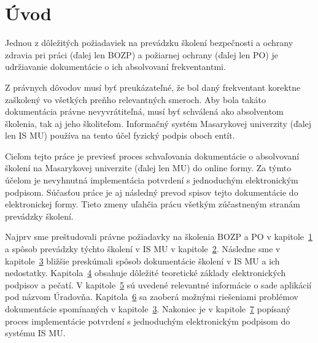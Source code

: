 \documentclass[
  digital,     %
  oneside,     %
  nosansbold,  %
  nocolorbold, %
  lof,         %
  nolot,         %
]{fithesis4}
\begin{document}
\chapter*{Úvod}
\label{chap:intro}
Jednou z dôležitých požiadaviek na prevádzku školení bezpečnosti a ochrany zdravia pri práci (ďalej len BOZP) a požiarnej ochrany (ďalej len PO) je udržiavanie dokumentácie o ich absolvovaní frekventantmi.

Z právnych dôvodov musí byť preukázateľné, že bol daný frekventant korektne zaškolený vo všetkých preňho relevantných smeroch. Aby bola takáto dokumentácia právne nevyvrátiteľná, musí byť schválená ako absolventom školenia, tak aj jeho školiteľom. Informačný systém Masarykovej univerzity (ďalej len IS MU) používa na tento účel fyzický podpis oboch entít.

Cieľom tejto práce je previesť proces schvaľovania dokumentácie o absolvovaní školení na Masarykovej univerzite (ďalej len MU) do online formy. Za týmto účelom je nevyhnutná implementácia potvrdení s jednoduchým elektronickým podpisom. Súčasťou práce je aj následný prevod spisov tejto dokumentácie do elektronickej formy. Tieto zmeny uľahčia prácu všetkým zúčastneným stranám prevádzky školení.

Najprv sme preštudovali právne požiadavky na školenia BOZP a PO v kapitole~\hyperref[kap-1]{1} a spôsob prevádzky týchto školení v IS MU v kapitole~\hyperref[kap-2]{2}. Následne sme v kapitole~\hyperref[kap-3]{3} bližšie preskúmali spôsob dokumentácie školení v IS MU a ich nedostatky. Kapitola~\hyperref[kap-4]{4} obsahuje dôležité teoretické základy elektronických podpisov a pečatí. V kapitole~\hyperref[kap-5]{5} sú uvedené relevantné informácie o sade aplikácií pod názvom Úradovňa. Kapitola~\hyperref[kap-6]{6} sa zaoberá možnými riešeniami problémov dokumentácie spomínaných v kapitole~\hyperref[kap-3]{3}. Nakoniec je v kapitole~\hyperref[kap-7]{7} popísaný proces implementácie potvrdení s jednoduchým elektronickým podpisom do systému IS MU.
\end{document}
